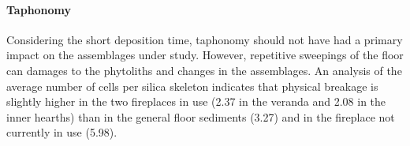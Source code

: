 \documentclass[authoryear,preprint,review,12pt]{elsarticle}
\begin{document}
\begin{table}[]
\centering
\caption{Summary of the phytoliths and geochemical analysis. All values, except phytolith concentration are given as percentages.}
\end{table}

\paragraph{Taphonomy}
Considering the short deposition time, taphonomy should not have had a primary impact on the assemblages under study. However, repetitive sweepings of the floor can damages to the phytoliths and changes in the assemblages. An analysis of the average number of cells per silica skeleton indicates that physical breakage is slightly higher in the two fireplaces in use (2.37 in the veranda and 2.08 in the inner hearths) than in the general floor sediments (3.27) and in the fireplace not currently in use (5.98).
\end{document}
